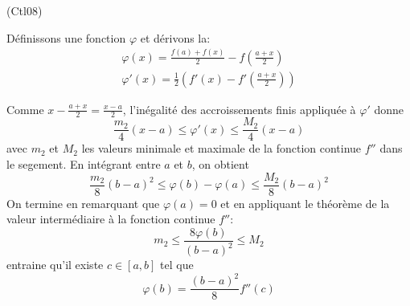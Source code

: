 \begin{tiny}(Ctl08)\end{tiny} Définissons une fonction $\varphi$ et dérivons la:
\begin{multline*}
  \varphi(x) = \frac{f(a)+f(x)}{2} - f(\frac{a+x}{2})\\
\varphi'(x) = \frac{1}{2}\left(f'(x)-f'(\frac{a+x}{2}) \right) 
\end{multline*}

Comme $x-\frac{a+x}{2}=\frac{x-a}{2}$, l'inégalité des accroissements finis appliquée à $\varphi'$ donne
\begin{displaymath}
  \frac{m_2}{4}(x-a)\leq \varphi'(x)\leq \frac{M_2}{4}(x-a) 
\end{displaymath}
avec $m_2$ et $M_2$ les valeurs minimale et maximale de la fonction continue $f''$ dans le segement.\newline
En intégrant entre $a$ et $b$, on obtient 
\begin{displaymath}
  \frac{m_2}{8}(b-a)^2\leq \varphi(b)-\varphi(a)\leq \frac{M_2}{8}(b-a)^2
\end{displaymath}
On termine en remarquant que $\varphi(a)=0$ et en appliquant le théorème de la valeur intermédiaire à la fonction continue $f''$:
\begin{displaymath}
  m_2\leq \frac{8\varphi(b)}{(b-a)^2}\leq M_2  
\end{displaymath}
entraine qu'il existe $c\in [a,b]$ tel que 
\begin{displaymath}
  \varphi(b) = \frac{(b-a)^2}{8}f''(c)
\end{displaymath}
